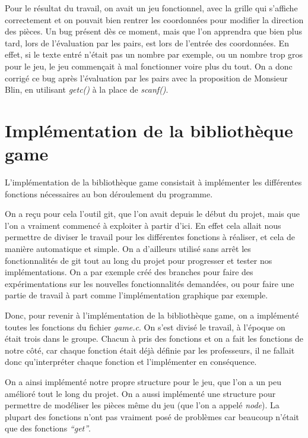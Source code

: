 ﻿\documentclass[12pt]{article}
\begin{document}
Pour le résultat du travail, on avait un jeu fonctionnel, avec la grille qui s'affiche correctement et on pouvait bien rentrer les coordonnées pour modifier la direction des pièces.
Un bug présent dès ce moment, mais que l’on apprendra que bien plus tard, lors de l’évaluation par les pairs, est lors de l’entrée des coordonnées. En effet, si le texte entré n’était pas un nombre par exemple, ou un nombre trop gros pour le jeu, le jeu commençait à mal fonctionner voire plus du tout.
On a donc corrigé ce bug après l’évaluation par les pairs avec la proposition de Monsieur Blin, en utilisant \emph{getc()} à la place de \emph{scanf()}.


\section{Implémentation de la bibliothèque game}


L’implémentation de la bibliothèque game consistait à implémenter les différentes fonctions nécessaires au bon déroulement du programme.


On a reçu pour cela l’outil git, que l’on avait depuis le début du projet, mais que l’on a vraiment commencé à exploiter à partir d’ici. En effet cela allait nous permettre de diviser le travail pour les différentes fonctions à réaliser, et cela de manière automatique et simple. On a d’ailleurs utilisé sans arrêt les fonctionnalités de git tout au long du projet pour progresser et tester nos implémentations. On a par exemple créé des branches pour faire des expérimentations sur les nouvelles fonctionnalités demandées, ou pour faire une partie de travail à part comme l’implémentation graphique par exemple.


Donc, pour revenir à l’implémentation de la bibliothèque game, on a implémenté toutes les fonctions du fichier \emph{game.c}. On s’est divisé le travail, à l’époque on était trois dans le groupe.
Chacun à pris des fonctions et on a fait les fonctions de notre côté, car chaque fonction était déjà définie par les professeurs, il ne fallait donc qu’interpréter chaque fonction et l’implémenter en conséquence.


On a ainsi implémenté notre propre structure pour le jeu, que l’on a un peu amélioré tout le long du projet. On a aussi implémenté une structure pour permettre de modéliser les pièces même du jeu (que l’on a appelé \emph{node}). La plupart des fonctions n’ont pas vraiment posé de problèmes car beaucoup n’était que des fonctions \emph{“get”}.
\end{document}
